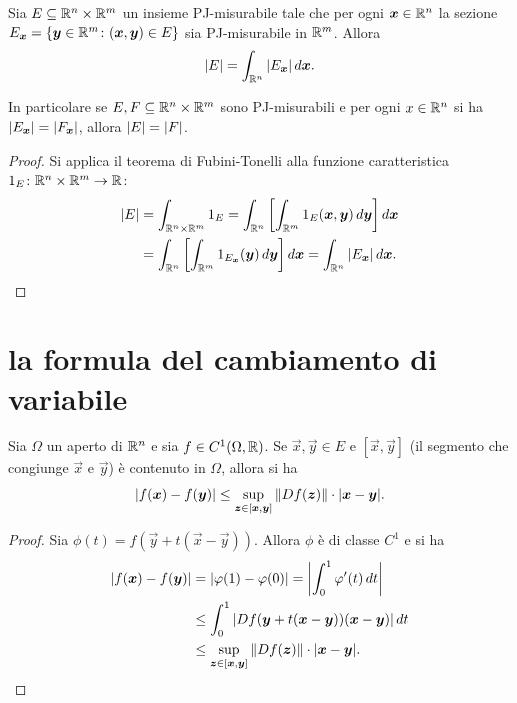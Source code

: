 \begin{theorem}
  \label{th:cavalieri}
Sia $E \subseteq {\mathbb R}^n\times {\mathbb R}^m$ un insieme PJ-misurabile 
tale che per ogni $\boldsymbol x \in {\mathbb R}^n$ la sezione 
$  E_{\boldsymbol x} = {\left\{ \boldsymbol y \in {\mathbb R}^m \colon (\boldsymbol x, \boldsymbol y) \in E \right\}} $ 
sia PJ-misurabile in ${\mathbb R}^m$.
Allora
\[
  {\left|E\right|} = \int_{{\mathbb R}^n} {\left|E_{\boldsymbol x}\right|}\, d\boldsymbol x.
\]

In particolare se $E,F\subseteq {\mathbb R}^n\times {\mathbb R}^m$ sono PJ-misurabili 
e per ogni $x\in {\mathbb R}^n$ si ha ${\left|E_{\boldsymbol x}\right|} = {\left|F_{\boldsymbol x}\right|}$,
allora ${\left|E\right|} = {\left|F\right|}$.
\end{theorem}
\begin{proof}
Si applica il teorema di Fubini-Tonelli alla funzione caratteristica 
$1_E\colon {\mathbb R}^n\times {\mathbb R}^m \to {\mathbb R}$:
\begin{align*}
  {\left|E\right|} &= \int_{{\mathbb R}^n\times {\mathbb R}^m} 1_E
  = \int_{{\mathbb R}^n} {\left[ \int_{{\mathbb R}^m} 1_E(\boldsymbol x, \boldsymbol y)\, d\boldsymbol y \right]}\, d\boldsymbol x\\
  &= \int_{{\mathbb R}^n} {\left[ \int_{{\mathbb R}^m} 1_{E_{\boldsymbol x}}(\boldsymbol y)\, d\boldsymbol y \right]}\, d\boldsymbol x
  = \int_{{\mathbb R}^n} {\left|E_{\boldsymbol x}\right|}\, d \boldsymbol x.
\end{align*}
\end{proof}


\section{la formula del cambiamento di variabile}

\begin{lemma}
  \label{lm:disuguaglianza_lagrange}
Sia $\Omega$ un aperto di ${\mathbb R}^n$ e sia $f\in C^1(\Omega,{\mathbb R})$.
Se $\vec x,\vec y \in E$ e $[\vec x,\vec y]$ (il segmento che congiunge 
$\vec x$ e $\vec y$) è contenuto in $\Omega$, allora si ha
\[
  {\left|f(\boldsymbol x) - f(\boldsymbol y)\right|} \le \sup_{\boldsymbol z \in [\boldsymbol x,\boldsymbol y]} {\left\Vert Df(\boldsymbol z)\right\Vert}\cdot{\left|\boldsymbol x - \boldsymbol y\right|}.
\]
\end{lemma}
\begin{proof}
Sia $\phi(t) = f(\vec y + t(\vec x - \vec y))$.
Allora $\phi$ è di classe $C^1$ e si ha
\begin{align*}
{\left|f(\boldsymbol x) - f(\boldsymbol y)\right|}
&= {\left|\varphi(1) - \varphi(0)\right|}
= {\left|\int_0^1 \varphi'(t)\, dt\right|}\\
& \le \int_0^1 {\left|Df(\boldsymbol y + t(\boldsymbol x - \boldsymbol y))(\boldsymbol x - \boldsymbol y)\right|}\, dt \\
& \le \sup_{\boldsymbol z \in [\boldsymbol x,\boldsymbol y]} {\left\Vert Df(\boldsymbol z)\right\Vert}\cdot {\left|\boldsymbol x - \boldsymbol y\right|}.
\end{align*}
\end{proof}

